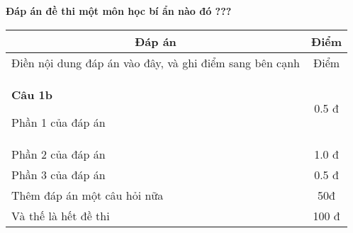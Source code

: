 \documentclass[12pt,a4paper]{article}
\author{Vũ Ngọc Bình}
\newcommand*{\thead}[1]{\multicolumn{1}{c}{\bfseries #1}}
\begin{document}
	\begin{center}
		\textbf{{\large Đáp án đề thi một môn học bí ẩn nào đó ???}}
	\end{center}
	
	\begin{longtable}{b{} c}
		\toprule
		\thead{Đáp án} 
		& \thead{Điểm} 
		\\ \midrule 
		
		Điền nội dung đáp án vào đây, và ghi điểm sang bên cạnh
		&
		Điểm
		\\ \midrule
		\textbf{Câu 1b}
		
		Phần 1 của đáp án
		& 
		0.5 đ          
		\\
		Phần 2 của đáp án
		& 
		1.0 đ       
		\\
		Phần 3 của đáp án
		& 
		0.5 đ          
		\\ \midrule
		Thêm đáp án một câu hỏi nữa
		&
		50đ       
		\\ \midrule
		Và thế là hết đề thi
		&
		100 đ            
		\\ \bottomrule
	\end{longtable}
\end{document}
